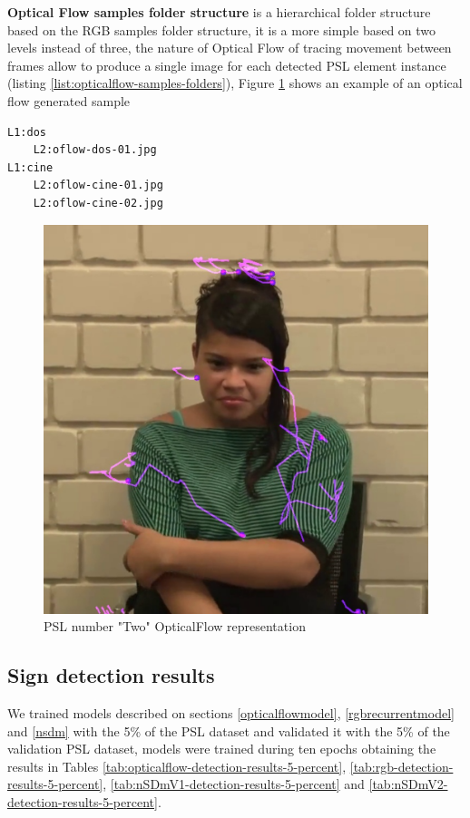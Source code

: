\documentclass[twocolumn,conference]{article}
\begin{document}
\textbf{Optical Flow samples folder structure} is a hierarchical folder structure based on the RGB samples folder structure, it is a more simple based on two levels instead of three, the nature of Optical Flow of tracing movement between frames allow to produce a single image for each detected PSL element instance (listing \ref{list:opticalflow-samples-folders}), Figure \ref{fig:opticalflow-two} shows an example of an optical flow generated sample
\begin{lstlisting}[caption=Optical Flow Samples Folder Structure example, basicstyle=\ttfamily\small]
L1:dos
	L2:oflow-dos-01.jpg
L1:cine
	L2:oflow-cine-01.jpg
	L2:oflow-cine-02.jpg
\end{lstlisting}\label{list:opticalflow-samples-folders}
\begin{figure}[hbt!]
\centering
\includegraphics[scale=0.3]{images/dos-opticalflow.jpg}
\caption{PSL number "Two" OpticalFlow representation}
\label{fig:opticalflow-two}
\end{figure}

\subsection{Sign detection results}
We trained models described on sections \ref{opticalflowmodel}, \ref{rgbrecurrentmodel} and \ref{nsdm} with the 5\% of the PSL dataset and validated it with the 5\% of the validation PSL dataset, models were trained during ten epochs obtaining the results in Tables \ref{tab:opticalflow-detection-results-5-percent}, \ref{tab:rgb-detection-results-5-percent}, \ref{tab:nSDmV1-detection-results-5-percent} and \ref{tab:nSDmV2-detection-results-5-percent}.
\end{document}
